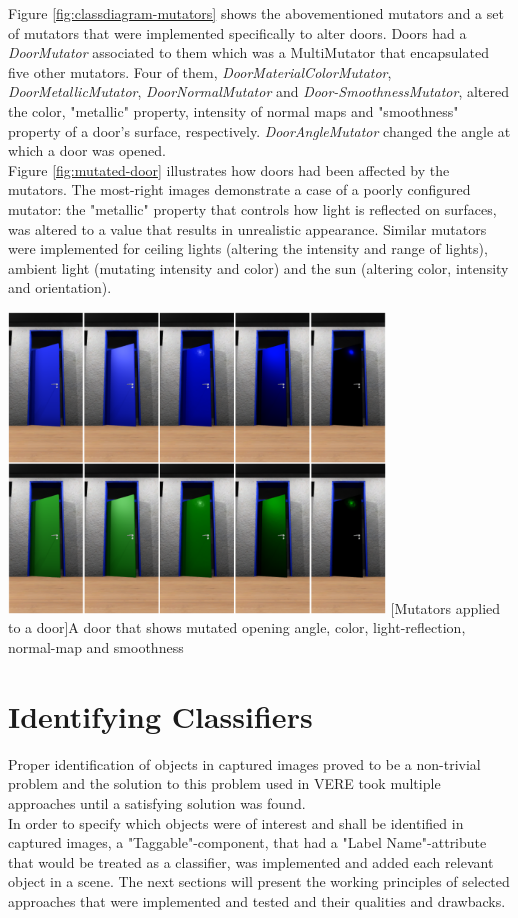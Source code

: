 Figure \ref{fig:classdiagram-mutators} shows the abovementioned mutators and a set of mutators that were implemented specifically to alter doors. Doors had a \emph{DoorMutator} associated to them which was a MultiMutator that encapsulated five other mutators. Four of them, \emph{DoorMaterialColorMutator}, \emph{DoorMetallicMutator}, \emph{DoorNormalMutator} and \emph{Door-SmoothnessMutator}, altered the color, "metallic" property, intensity of normal maps and "smoothness" property of a door's surface, respectively. \emph{DoorAngleMutator} changed the angle at which a door was opened.\\
Figure \ref{fig:mutated-door} illustrates how doors had been affected by the mutators. The most-right images demonstrate a case of a poorly configured mutator: the "metallic" property that controls how light is reflected on surfaces, was altered to a value that results in unrealistic appearance. Similar mutators were implemented for ceiling lights (altering the intensity and range of lights), ambient light (mutating intensity and color) and the sun (altering color, intensity and orientation).
\begin{center}
    \noindent
    \includegraphics[width=10cm]{img/ch05/Results_Door.png}
    [Mutators applied to a door]{A door that shows mutated opening angle, color, light-reflection, normal-map and smoothness}
    \label{fig:mutated-door}
\end{center}

\section{Identifying Classifiers}
Proper identification of objects in captured images proved to be a non-trivial problem and the solution to this problem used in \ac{VERE} took multiple approaches until a satisfying solution was found.\\
In order to specify which objects were of interest and shall be identified in captured images, a "Taggable"-component, that had a "Label Name"-attribute that would be treated as a classifier, was implemented and added each relevant object in a scene. The next sections will present the working principles of selected approaches that were implemented and tested and their qualities and drawbacks.


